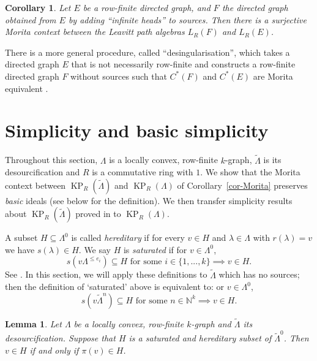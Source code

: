 \documentclass[a4paper,12pt]{amsart}
\numberwithin{equation}{section}
\newtheorem{lemma}[thm]{Lemma}
\newtheorem{cor}[thm]{Corollary}
\theoremstyle{definition}
\theoremstyle{remark}
\begin{document}
\begin{cor}
Let $E$ be a row-finite directed graph, and $F$ the directed graph obtained from $E$ by adding ``infinite heads'' to sources.  Then there is a surjective Morita context between the Leavitt path algebras $L_R(F)$ and $L_R(E)$.
\end{cor}

There is a more general procedure, called ``desingularisation'', which takes a directed graph $E$ 
that is not necessarily row-finite and constructs a row-finite directed graph $F$ without sources such that $C^*(F)$ and $C^*(E)$ are Morita equivalent \cite[Theorem~2.11]{DT}.

\section{Simplicity and basic simplicity}\label{sec-simplicity}

Throughout this section, $\Lambda$ is a locally convex, row-finite $k$-graph,
${\tilde{\Lambda}}$ is its desourcification and $R$ is a commutative ring with $1$.  
We show
that the Morita context between $\operatorname{KP}_R({\tilde{\Lambda}})$ and $\operatorname{KP}_R(\Lambda)$ of Corollary~\ref{cor-Morita}
preserves  \emph{basic} ideals (see below for the definition).   We then transfer simplicity 
results about $\operatorname{KP}_R({\tilde{\Lambda}})$ proved in \cite{ACaHR} to $\operatorname{KP}_R(\Lambda)$. 

A subset $H \subseteq \Lambda^0$ is called \emph{hereditary} if
for every $v \in H$ and $\lambda \in \Lambda$ with $r(\lambda)=v$
we have $s(\lambda) \in H$.   We say $H$ is  \emph{saturated} if for $v \in \Lambda^0$,
\[s(v\Lambda^{\leq e_i}) \subseteq H \text{ for some } i \in \{1, ..., k\} \implies
 v \in H.
\] See \cite[page~113]{RSY03}.
In this section, we will apply these definitions to ${\tilde{\Lambda}}$ which has no 
sources; then the  definition of `saturated' above is equivalent to: or $v \in \Lambda^0$,
\[s(v{\tilde{\Lambda}}^{n}) \subseteq H \text{ for some } n \in {\mathbb{N}}^k \implies
 v \in H.
\] 
\begin{lemma}
\label{lem:sat_pi}
Let $\Lambda$ be a locally convex, row-finite $k$-graph and ${\tilde{\Lambda}}$ 
its desourcification.  Suppose that $H$ is a saturated and hereditary subset of ${\tilde{\Lambda}}^0$.  Then
$v \in H$ if and only if $\pi(v) \in H$.  
\end{lemma}
\end{document}

